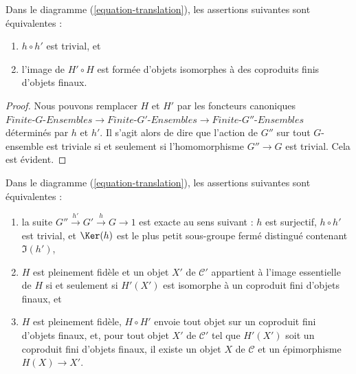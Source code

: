 \begin{lemma}
\label{lemma-composition-trivial}
Dans le diagramme (\ref{equation-translation}), les assertions suivantes sont équivalentes :
\begin{enumerate}
\item $h \circ h'$ est trivial, et
\item l'image de $H' \circ H$ est formée d'objets isomorphes à des coproduits
finis d'objets finaux.
\end{enumerate}
\end{lemma}

\begin{proof}
Nous pouvons remplacer $H$ et $H'$ par les foncteurs canoniques
$\textit{Finite-}G\textit{-Ensembles} \to \textit{Finite-}G'\textit{-Ensembles}
\to \textit{Finite-}G''\textit{-Ensembles}$ déterminés par $h$ et $h'$.
Il s'agit alors de dire que l'action de $G''$ sur tout $G$-ensemble est triviale
si et seulement si l'homomorphisme $G'' \to G$ est trivial. Cela est évident.
\end{proof}

\begin{lemma}
\label{lemma-functoriality-galois-ses}
Dans le diagramme (\ref{equation-translation}), les assertions suivantes sont équivalentes :
\begin{enumerate}
\item la suite $G'' \xrightarrow{h'} G' \xrightarrow{h} G \to 1$
est exacte au sens suivant : $h$ est surjectif, $h \circ h'$ est trivial,
et $\Ker(h)$ est le plus petit sous-groupe fermé distingué contenant $\Im(h')$,
\item $H$ est pleinement fidèle et un objet $X'$ de $\mathcal{C}'$ appartient à
l'image essentielle de $H$ si et seulement si $H'(X')$ est isomorphe à un
coproduit fini d'objets finaux, et
\item $H$ est pleinement fidèle, $H \circ H'$ envoie tout objet sur un coproduit
fini d'objets finaux, et, pour tout objet $X'$ de $\mathcal{C}'$
tel que $H'(X')$ soit un coproduit fini d'objets finaux, il existe
un objet $X$ de $\mathcal{C}$ et un épimorphisme $H(X) \to X'$.
\end{enumerate}
\end{lemma}

